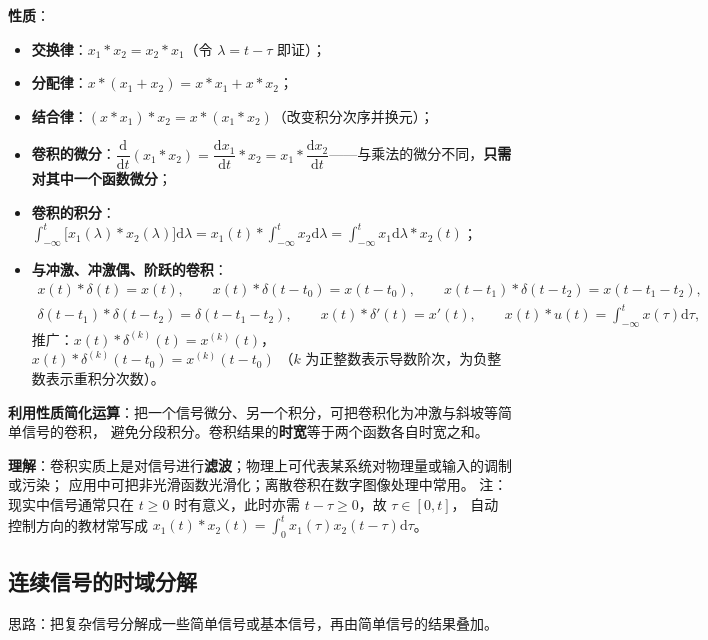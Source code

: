 \textbf{性质}：
\begin{itemize}
\item \textbf{交换律}：$x_1*x_2=x_2*x_1$（令 $\lambda=t-\tau$ 即证）；
\item \textbf{分配律}：$x*(x_1+x_2)=x*x_1+x*x_2$；
\item \textbf{结合律}：$(x*x_1)*x_2=x*(x_1*x_2)$（改变积分次序并换元）；
\item \textbf{卷积的微分}：$\dfrac{\mathrm{d}}{\mathrm{d}t}(x_1*x_2)=\dfrac{\mathrm{d}x_1}{\mathrm{d}t}*x_2
  =x_1*\dfrac{\mathrm{d}x_2}{\mathrm{d}t}$——与乘法的微分不同，\textbf{只需对其中一个函数微分}；
\item \textbf{卷积的积分}：$\displaystyle\int_{-\infty}^{t}\big[x_1(\lambda)*x_2(\lambda)\big]\mathrm{d}\lambda
  =x_1(t)*\int_{-\infty}^{t}x_2\mathrm{d}\lambda=\int_{-\infty}^{t}x_1\mathrm{d}\lambda*x_2(t)$；
\item \textbf{与冲激、冲激偶、阶跃的卷积}：
  \begin{equation}
  \begin{gathered}
  x(t)*\delta(t)=x(t),\qquad x(t)*\delta(t-t_0)=x(t-t_0),\qquad
  x(t-t_1)*\delta(t-t_2)=x(t-t_1-t_2),\\
  \delta(t-t_1)*\delta(t-t_2)=\delta(t-t_1-t_2),\qquad
  x(t)*\delta'(t)=x'(t),\qquad
  x(t)*u(t)=\int_{-\infty}^{t}x(\tau)\mathrm{d}\tau,
  \end{gathered}
  \end{equation}
  推广：$x(t)*\delta^{(k)}(t)=x^{(k)}(t)$，$x(t)*\delta^{(k)}(t-t_0)=x^{(k)}(t-t_0)$
  （$k$ 为正整数表示导数阶次，为负整数表示重积分次数）。
\end{itemize}

\textbf{利用性质简化运算}：把一个信号微分、另一个积分，可把卷积化为冲激与斜坡等简单信号的卷积，
避免分段积分。卷积结果的\textbf{时宽}等于两个函数各自时宽之和。

\textbf{理解}：卷积实质上是对信号进行\textbf{滤波}；物理上可代表某系统对物理量或输入的调制或污染；
应用中可把非光滑函数光滑化；离散卷积在数字图像处理中常用。
注：现实中信号通常只在 $t\ge0$ 时有意义，此时亦需 $t-\tau\ge0$，故 $\tau\in[0,t]$，
自动控制方向的教材常写成 $x_1(t)*x_2(t)=\displaystyle\int_{0}^{t}x_1(\tau)x_2(t-\tau)\mathrm{d}\tau$。

\subsection{连续信号的时域分解}

思路：把复杂信号分解成一些简单信号或基本信号，再由简单信号的结果叠加。

